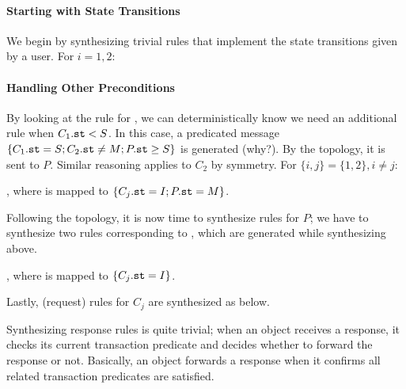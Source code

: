 \documentclass[format=manuscript]{acmart}
\begin{document}
\paragraph{Starting with State Transitions}

We begin by synthesizing trivial rules that implement the state transitions
given by a user. For $i = 1, 2$:

\begin{center}
\end{center}

\paragraph{Handling Other Preconditions}

By looking at the rule for , we can deterministically know we need
an additional rule when $C_1.\texttt{st} < S$. In this case, a predicated message $\{
C_1.\texttt{st} = S; C_2.\texttt{st} \neq M; P.\texttt{st} \geq S \}$ is generated (why?). By
the topology, it is sent to $P$. Similar reasoning applies to $C_2$ by symmetry.
For $\{i, j\} = \{1, 2\}, i \neq j$:

\begin{center}
  , where
   is mapped to $\{ C_j.\texttt{st} = I; P.\texttt{st} = M \}$.
\end{center}

Following the topology, it is now time to synthesize rules for $P$; we have to
synthesize two rules corresponding to , which are generated
while synthesizing  above.

\begin{center}
  , where
   is mapped to $\{ C_j.\texttt{st} = I \}$.
\end{center}

Lastly, (request) rules for $C_j$ are synthesized as below.

\begin{center}
\end{center}

Synthesizing response rules is quite trivial; when an object receives a
response, it checks its current transaction predicate and decides whether to
forward the response or not. Basically, an object forwards a response when it
confirms all related transaction predicates are satisfied.
\end{document}

